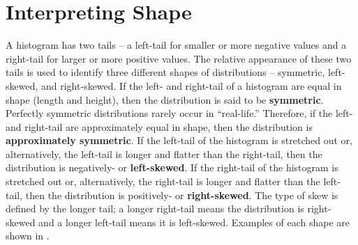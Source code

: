 \documentclass[10pt,openany]{book}\usepackage[]{graphicx}\usepackage[]{color}
\begin{document}
\section{Interpreting Shape}
A histogram has two tails -- a left-tail for smaller or more negative values and a right-tail for larger or more positive values.  The relative appearance of these two tails is used to identify three different shapes of distributions -- symmetric, left-skewed, and right-skewed.  If the left- and right-tail of a histogram are equal in shape (length and height), then the distribution is said to be \textbf{symmetric}.  Perfectly symmetric distributions rarely occur in ``real-life.''  Therefore, if the left- and right-tail are approximately equal in shape, then the distribution is \textbf{approximately symmetric}.  If the left-tail of the histogram is stretched out or, alternatively, the left-tail is longer and flatter than the right-tail, then the distribution is negatively- or \textbf{left-skewed}.  If the right-tail of the histogram is stretched out or, alternatively, the right-tail is longer and flatter than the left-tail, then the distribution is positively- or \textbf{right-skewed}.  The type of skew is defined by the longer tail; a longer right-tail means the distribution is right-skewed and a longer left-tail means it is left-skewed.  Examples of each shape are shown in .
\end{document}
